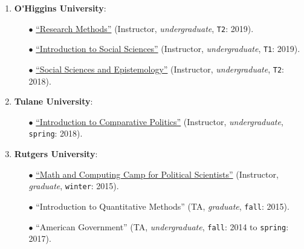 \begin{enumerate}

\item {\bf O\'\unskip Higgins University}:
  
    \begin{itemize}
      \item[$\bullet$] \href{https://github.com/hbahamonde/Metodos_de_Investigacion/raw/master/Bahamonde_Metodos_de_Investigacion.pdf}{``Research Methods''} (Instructor, \emph{undergraduate}, \texttt{T2}: 2019).
      \item[$\bullet$] \href{https://github.com/hbahamonde/Intro_Ciencias_Sociales/raw/master/Bahamonde_Intro_Ciencias_Sociales.pdf}{``Introduction to Social Sciences''} (Instructor, \emph{undergraduate}, \texttt{T1}: 2019).
      \item[$\bullet$] \href{https://github.com/hbahamonde/Social_Sciences_Epistemology_UGRAD/raw/master/Bahamonde_Social_Sciences_Epistemology_UGRAD_Syllabus.pdf}{``Social Sciences and Epistemology''} (Instructor, \emph{undergraduate}, \texttt{T2}: 2018).
    \end{itemize}

\item {\bf Tulane University}:
  
    \begin{itemize}
      \item[$\bullet$] \href{https://github.com/hbahamonde/Comparative_Politics_UGRAD/raw/master/Bahamonde_Comparative_Politics_Syllabus_UGRAD.pdf}{``Introduction to Comparative Politics''} (Instructor, \emph{undergraduate}, \texttt{spring}: 2018).
    \end{itemize}

\item {\bf Rutgers University}:

    \begin{itemize}
      \item[$\bullet$] \href{http://github.com/hbahamonde/Math-Camp/raw/master/Syllabus/Math_Camp_Syllabus.pdf/}{``Math and Computing Camp for Political Scientists''} (Instructor, \emph{graduate}, \texttt{winter}: 2015).
      
      \item[$\bullet$] ``Introduction to Quantitative Methods'' (TA, \emph{graduate}, \texttt{fall}: 2015).
      
      \item[$\bullet$] ``American Government'' (TA, \emph{undergraduate}, \texttt{fall}: 2014 to \texttt{spring}: 2017).
    \end{itemize}

\end{enumerate}